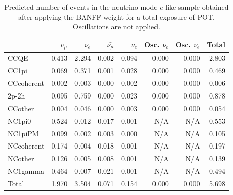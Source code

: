 
\begin{table}
\center
\begin{tabular} { | l ||r | r | r | r | r | r | | r | }
\hline
               & $\nu_\mu$            & $\nu_e$              & $\bar{\nu_\mu}$      & $\bar{\nu_e}$        & Osc. $\nu_e$         & Osc. $\bar{\nu_e}$   & Total                \\ \hline\hline
 CCQE         & 0.413                & 2.294                & 0.002                & 0.094                & 0.000                & 0.000                & 2.803                \\ \hline
 CC1pi        & 0.069                & 0.371                & 0.001                & 0.028                & 0.000                & 0.000                & 0.469                \\ \hline
 CCcoherent   & 0.002                & 0.003                & 0.000                & 0.002                & 0.000                & 0.000                & 0.006                \\ \hline
 2p-2h          & 0.095                & 0.759                & 0.000                & 0.023                & 0.000                & 0.000                & 0.878                \\ \hline
 CCother      & 0.004                & 0.046                & 0.000                & 0.003                & 0.000                & 0.000                & 0.054                \\ \hline
 NC1pi0       & 0.524                & 0.012                & 0.017                & 0.001                & N/A                  & N/A                  & 0.553                \\ \hline
 NC1piPM      & 0.099                & 0.002                & 0.003                & 0.000                & N/A                  & N/A                  & 0.105                \\ \hline
 NCcoherent   & 0.174                & 0.004                & 0.018                & 0.001                & N/A                  & N/A                  & 0.197                \\ \hline
 NCother      & 0.126                & 0.005                & 0.008                & 0.001                & N/A                  & N/A                  & 0.139                \\ \hline
 NC1gamma     & 0.464                & 0.007                & 0.021                & 0.001                & N/A                  & N/A                  & 0.494                \\ \hline
\hline
 Total        & 1.970                & 3.504                & 0.071                & 0.154                & 0.000                & 0.000                & 5.698                \\ \hline

\end{tabular}
\caption{
Predicted number of events in the neutrino mode $e$-like sample
obtained after applying the BANFF weight
for a total exposure of \TotalPotNu{} POT.
Oscillations are not applied.
}
\label{tab:events_1re_NoOsc}
\end{table}


